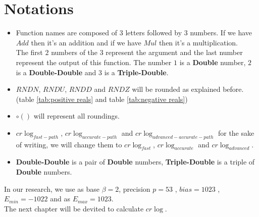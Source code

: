 \section{Notations}
\begin{itemize}
    \item Function names are composed of $3$ letters followed by $3$ numbers.
If we have $Add$ then it's an addition and if we have $Mul$ then it's a multiplication.\\ 
The first $2$ numbers of the $3$ represent the argument and the last number represent the output of this function.
The number $1$ is a \textbf{Double} number, $2$ is a \textbf{Double-Double} and $3$ is a \textbf{Triple-Double}.
\item $RNDN$, $RNDU$, $RNDD$ and $RNDZ$ will be rounded as explained before.(table \ref{tab:positive reals} and table \ref{tab:negative reals})

\item $\circ()$ will represent all roundings. 

\item $cr\log_{fast-path}$, $cr\log_{accurate-path}$ and $cr\log_{advanced-accurate-path}$ for the sake of writing, we will change them to $cr\log_{fast}$, $cr\log_{accurate}$ and $cr\log_{advanced}$.

\item  \textbf{Double-Double} is a pair of \textbf{Double} numbers, \textbf{Triple-Double} is a triple of \textbf{Double} numbers.

\end{itemize}


In our research, we use as base $\beta = 2$,  precision $p = 53$ , $bias = 1023$ , $E_{min} = -1022$  and  as $E_{max} = 1023$.\\
The next chapter will be devited to calculate $cr\log$. 